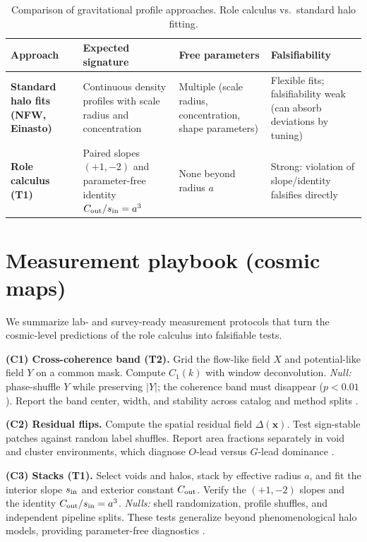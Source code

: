 \documentclass[12pt,a4paper,oneside]{scrreprt}
\begin{document}
\begin{table}[h]
\centering
\caption{Comparison of gravitational profile approaches. Role calculus vs.\ standard halo fitting.}
\begin{tabular}{p{3.2cm} p{4.2cm} p{3.5cm} p{3.5cm}}
\toprule
\textbf{Approach} & \textbf{Expected signature} & \textbf{Free parameters} & \textbf{Falsifiability} \\
\midrule
\textbf{Standard halo fits (NFW, Einasto)} & Continuous density profiles with scale radius and concentration & Multiple (scale radius, concentration, shape parameters) & Flexible fits; falsifiability weak (can absorb deviations by tuning) \\
\addlinespace
\textbf{Role calculus (T1)} & Paired slopes $(+1,-2)$ and parameter-free identity $C_{\rm out}/s_{\rm in} = a^3$ & None beyond radius $a$ & Strong: violation of slope/identity falsifies directly \\
\bottomrule
\end{tabular}
\end{table}

\section{Measurement playbook (cosmic maps)}\label{sec:lss-playbook}

We summarize lab- and survey-ready measurement protocols that turn the 
cosmic-level predictions of the role calculus into falsifiable tests. 

\textbf{(C1) Cross-coherence band (T2).} 
Grid the flow-like field $X$ and potential-like field $Y$ on a common mask. 
Compute $C_1(k)$ with window deconvolution. 
\emph{Null:} phase-shuffle $Y$ while preserving $|Y|$; the coherence band 
must disappear ($p<0.01$). 
Report the band center, width, and stability across catalog and method splits 
\citep{Planck2018Cosmo}.

\textbf{(C2) Residual flips.} 
Compute the spatial residual field $\Delta(\mathbf x)$. 
Test sign-stable patches against random label shuffles. 
Report area fractions separately in void and cluster environments, which 
diagnose $O$-lead versus $G$-lead dominance \citep{Hamaus2014Voids}. 

\textbf{(C3) Stacks (T1).} 
Select voids and halos, stack by effective radius $a$, and fit the 
interior slope $s_{\rm in}$ and exterior constant $C_{\rm out}$. 
Verify the $(+1,-2)$ slopes and the identity 
$C_{\rm out}/s_{\rm in} = a^3$. 
\emph{Nulls:} shell randomization, profile shuffles, and independent 
pipeline splits. 
These tests generalize beyond phenomenological halo models, 
providing parameter-free diagnostics \citep{Clampitt2015Voids,Sheldon2004WeakLensing}.
\end{document}
